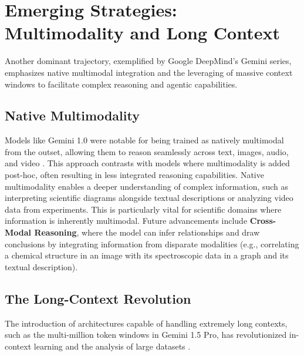 \documentclass{article}
\begin{document}
\section{Emerging Strategies: Multimodality and Long Context}
Another dominant trajectory, exemplified by Google DeepMind's Gemini series, emphasizes native multimodal integration and the leveraging of massive context windows to facilitate complex reasoning and agentic capabilities.

\subsection{Native Multimodality}
Models like Gemini 1.0 were notable for being trained as natively multimodal from the outset, allowing them to reason seamlessly across text, images, audio, and video \cite{deepmind2023gemini1}. This approach contrasts with models where multimodality is added post-hoc, often resulting in less integrated reasoning capabilities. Native multimodality enables a deeper understanding of complex information, such as interpreting scientific diagrams alongside textual descriptions or analyzing video data from experiments. This is particularly vital for scientific domains where information is inherently multimodal. Future advancements include \textbf{Cross-Modal Reasoning}, where the model can infer relationships and draw conclusions by integrating information from disparate modalities (e.g., correlating a chemical structure in an image with its spectroscopic data in a graph and its textual description).

\subsection{The Long-Context Revolution}
The introduction of architectures capable of handling extremely long contexts, such as the multi-million token windows in Gemini 1.5 Pro, has revolutionized in-context learning and the analysis of large datasets \cite{reid2024gemini}.
\end{document}

